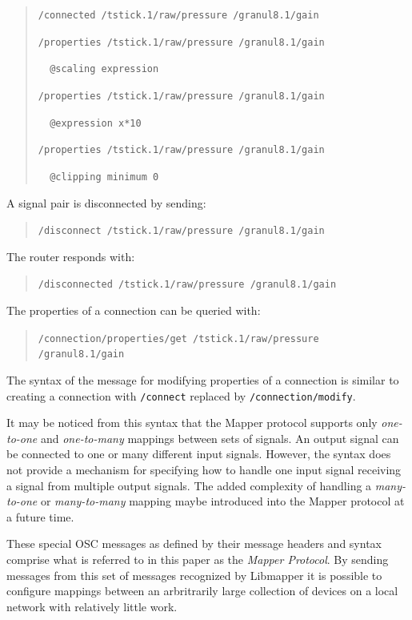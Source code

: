 \begin{quote}
\verb#/connected /tstick.1/raw/pressure /granul8.1/gain#

\verb#/properties /tstick.1/raw/pressure /granul8.1/gain#

\verb#  @scaling expression#

\verb#/properties /tstick.1/raw/pressure /granul8.1/gain#

\verb#  @expression x*10#

\verb#/properties /tstick.1/raw/pressure /granul8.1/gain#

\verb#  @clipping minimum 0#
\end{quote}

A signal pair is disconnected by sending:

\begin{quote}
\verb#/disconnect /tstick.1/raw/pressure /granul8.1/gain#
\end{quote}

The router responds with:

\begin{quote}
\verb#/disconnected /tstick.1/raw/pressure /granul8.1/gain#
\end{quote}

The properties of a connection can be queried with:

\begin{quote}
\verb#/connection/properties/get /tstick.1/raw/pressure /granul8.1/gain#
\end{quote}

The syntax of the message for modifying properties of a connection is similar to creating a connection with \verb#/connect# replaced by \verb#/connection/modify#.

It may be noticed from this syntax that the Mapper protocol supports only \emph{one-to-one} and \emph{one-to-many} mappings between sets of signals. An output signal can be connected to one or many different input signals. However, the syntax does not provide a mechanism for specifying how to handle one input signal receiving a signal from multiple output signals. The added complexity of handling a \emph{many-to-one} or \emph{many-to-many} mapping maybe introduced into the Mapper protocol at a future time.

These special OSC messages as defined by their message headers and syntax comprise what is referred to in this paper as the \emph{Mapper Protocol}. By sending messages from this set of messages recognized by Libmapper it is possible to configure mappings between an arbritrarily large collection of devices on a local network with relatively little work.


